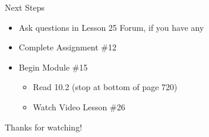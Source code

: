 \documentclass[t, aspectratio=169]{beamer}
\begin{document}
	\begin{frame}{Next Steps}
		\begin{itemize}
			\item Ask questions in Lesson 25 Forum, if you have any
			\item Complete Assignment \#12
			\item Begin Module \#15
			\begin{itemize}
				\item Read 10.2 (stop at bottom of page 720)
				\item Watch Video Lesson \#26
			\end{itemize}
		\end{itemize}
		
		\vfill
		
		Thanks for watching!
	\end{frame}
	
\end{document}
